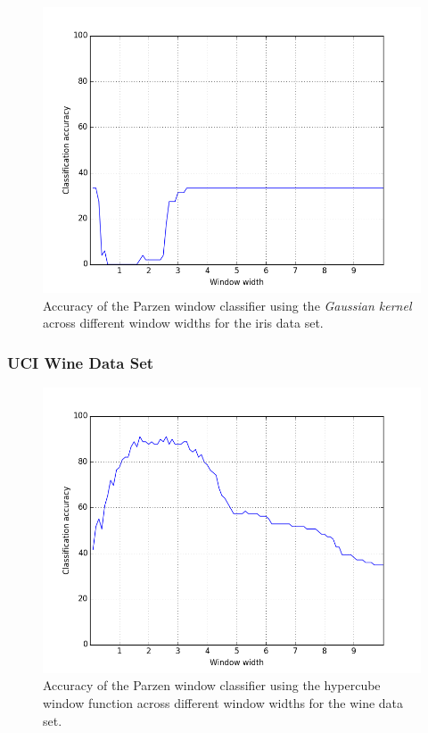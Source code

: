 \documentclass{article}
\numberwithin{figure}{section}
\newcommand{\imgwidth}{.8\textwidth}
\begin{document}
\begin{figure}[H]
\centering
\includegraphics[width=\imgwidth]{pg_iris}
\caption{Accuracy of the Parzen window classifier using the \emph{Gaussian kernel} across different window widths for the iris data set.}
\label{pg_iris}
\end{figure}

\subsubsection{UCI Wine Data Set}

\begin{figure}[H]
\centering
\includegraphics[width=\imgwidth]{p_box_wine}
\caption{Accuracy of the Parzen window classifier using the hypercube window function across different window widths for the wine data set.}
\label{pb_wine}
\end{figure}
\end{document}
